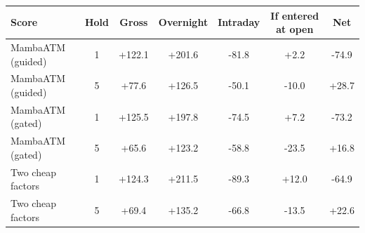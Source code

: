 {\tiny
\setlength{\tabcolsep}{1.5pt}
\begin{tabular}{lcccccc}
\toprule
\textbf{Score} & \textbf{Hold} & \textbf{Gross} & \textbf{Overnight} & \textbf{Intraday} & \textbf{If entered at open} & \textbf{Net} \\
\midrule
MambaATM (guided) & 1 & +122.1 & +201.6 & -81.8 & +2.2 & -74.9 \\
MambaATM (guided) & 5 & +77.6 & +126.5 & -50.1 & -10.0 & +28.7 \\
MambaATM (gated) & 1 & +125.5 & +197.8 & -74.5 & +7.2 & -73.2 \\
MambaATM (gated) & 5 & +65.6 & +123.2 & -58.8 & -23.5 & +16.8 \\
Two cheap factors & 1 & +124.3 & +211.5 & -89.3 & +12.0 & -64.9 \\
Two cheap factors & 5 & +69.4 & +135.2 & -66.8 & -13.5 & +22.6 \\
\bottomrule
\end{tabular}
}
